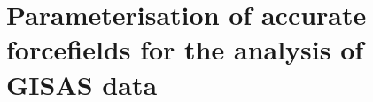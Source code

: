 
\chapter{Parameterisation of accurate forcefields for the analysis of GISAS data} %

\label{gisas} %


%
%
%
%
